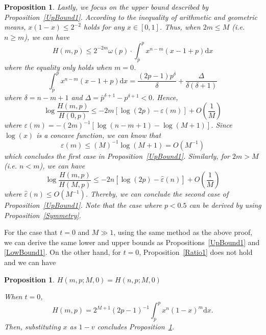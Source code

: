 \documentclass{article}
\makeatletter
\newtheorem{proposition}[theorem]{Proposition}
\renewenvironment{proof}[1][\proofname]{\par
  \vspace{-\topsep}%
  \pushQED{\qed}%
  \normalfont
  \topsep0pt \partopsep0pt %
  \trivlist
  \item[\hskip\labelsep
        \itshape
    #1\@addpunct{.}]\ignorespaces
}{%
  \popQED\endtrivlist\@endpefalse
  \addvspace{0pt plus 0pt} %
}
\makeatother
\begin{document}
\begin{proposition}
\begin{proof}
Lastly, we focus on the upper bound described by Proposition~\ref{UpBound1}. According to the inequality of arithmetic and geometric means, $x(1-x)\leq 2^{-2}$ holds for any $x\in [0,1]$. Thus, when $2m\leq M$ (i.e. $n\geq m$), we can have
\begin{equation}
H(m,p)\leq 2^{-2m}\omega(p)\cdot \int_{\bar{p}}^{p}x^{n-m}(x-1+p)\mathrm{d}x
\end{equation}
where the equality only holds when $m=0$.
\begin{equation}
 \int_{\bar{p}}^{p}x^{n-m}(x-1+p)\mathrm{d}x=\frac{(2p-1)p^{\delta}}{\delta}+\frac{\Delta}{\delta(\delta+1)}
\end{equation}
where $\delta=n-m+1$ and $\Delta=\bar{p}^{\delta+1}-p^{\delta+1}<0$. Hence,
\begin{equation}
\log\frac{H(m,p)}{H(0,p)}\leq -2m[\log(2p)-\varepsilon(m)] + O\left(\frac{1}{M}\right)
\end{equation}
where $\varepsilon(m)=-(2m)^{-1}[\log(n-m+1)-\log(M+1)]$. Since $\log(x)$ is a concave function, we can know that
\begin{equation}
\varepsilon(m)\leq (M)^{-1}\log(M+1)=O\left(M^{-1}\right)
\end{equation}
which concludes the first case in Proposition~\ref{UpBound1}. Similarly, for $2m>M$ (i.e. $n<m$), we can have
\begin{equation}
\log\frac{H(m,p)}{H(M,p)}\leq -2n[\log(2p)-\hat{\varepsilon}(n)] + O\left(\frac{1}{M}\right)
\end{equation}
where $\hat{\varepsilon}(n)\leq O(M^{-1})$. Thereby, we can conclude the second case of Proposition~\ref{UpBound1}. Note that the case where $p<0.5$ can be derived by using Proposition~\ref{Symmetry}.
\end{proof}
\end{proposition}
For the case that $t=0$ and $M\gg 1$, using the same method as the above proof, we can derive the same lower and upper bounds as Propositions~\ref{UpBound1} and \ref{LowBound1}. On the other hand, for $t=0$, Proposition~\ref{Ratio1} does not hold and we can have
\begin{proposition}
\label{Ratio0}
$H(m,p;M,0)=H(n,p;M,0)$
\begin{proof}
When $t=0$,
\begin{equation}
H(m,p)=2^{M+1}(2p-1)^{-1}\int_{\bar{p}}^{p}x^n(1-x)^m\mathrm{d}x.
\end{equation}
Then, substituting $x$ as $1-v$ concludes Proposition~\ref{Ratio0}.
\end{proof}
\end{proposition}
\end{document}
